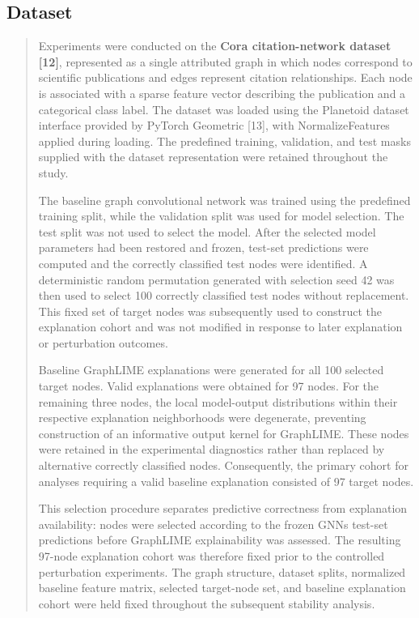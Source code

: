 \documentclass[a4paper]{article}
\begin{document}
\subsection{\texorpdfstring{Dataset }{Dataset }}\label{dataset}

\begin{quote}
Experiments were conducted on the \textbf{Cora citation-network dataset
{[}12{]}}, represented as a single attributed graph in which nodes
correspond to scientific publications and edges represent citation
relationships. Each node is associated with a sparse feature vector
describing the publication and a categorical class label. The dataset
was loaded using the Planetoid dataset interface provided by PyTorch
Geometric {[}13{]}, with NormalizeFeatures applied during loading. The
predefined training, validation, and test masks supplied with the
dataset representation were retained throughout the study.

The baseline graph convolutional network was trained using the
predefined training split, while the validation split was used for model
selection. The test split was not used to select the model. After the
selected model parameters had been restored and frozen, test-set
predictions were computed and the correctly classified test nodes were
identified. A deterministic random permutation generated with selection
seed 42 was then used to select 100 correctly classified test nodes
without replacement. This fixed set of target nodes was subsequently
used to construct the explanation cohort and was not modified in
response to later explanation or perturbation outcomes.

Baseline GraphLIME explanations were generated for all 100 selected
target nodes. Valid explanations were obtained for 97 nodes. For the
remaining three nodes, the local model-output distributions within their
respective explanation neighborhoods were degenerate, preventing
construction of an informative output kernel for GraphLIME. These nodes
were retained in the experimental diagnostics rather than replaced by
alternative correctly classified nodes. Consequently, the primary cohort
for analyses requiring a valid baseline explanation consisted of 97
target nodes.

This selection procedure separates predictive correctness from
explanation availability: nodes were selected according to the frozen
GNN\textquotesingle s test-set predictions before GraphLIME
explainability was assessed. The resulting 97-node explanation cohort
was therefore fixed prior to the controlled perturbation experiments.
The graph structure, dataset splits, normalized baseline feature matrix,
selected target-node set, and baseline explanation cohort were held
fixed throughout the subsequent stability analysis.
\end{quote}
\end{document}
